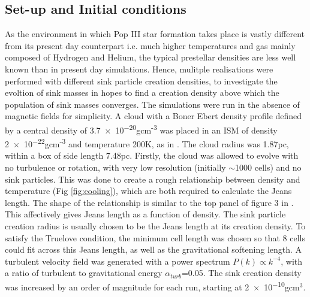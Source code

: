 \documentclass[11pt]{article}
\begin{document}
\subsection{Set-up and Initial conditions}
\label{sub:ics2}
As the environment in which Pop III star formation takes place is vastly different from its present day counterpart i.e. much higher temperatures and gas mainly composed of Hydrogen and Helium, the typical prestellar densities are less well known than in present day simulations. Hence, mulitple realisations were performed with different sink particle creation densities, to investigate the evoltion of sink masses in hopes to find a creation density above which the population of sink masses converges. The simulations were run in the absence of magnetic fields for simplicity. A cloud with a Boner Ebert density profile defined by a central density of \num{3.7e-20}gcm\textsuperscript{-3}  was placed in an ISM of density \num{2e-22}gcm\textsuperscript{-3} and temperature 200K, as in \cite{Wollenberg2019}. The cloud radius was 1.87pc, within a box of side length 7.48pc. Firstly, the cloud was allowed to evolve with no turbulence or rotation, with very low resolution (initially $\sim$1000 cells) and no sink particles. This was done to create a rough relationship between density and temperature (Fig \ref{fig:cooling}), which are both required to calculate the Jeans length. The shape of the relationship is similar to the top panel of figure 3 in \cite{Yoshida2006}. This affectively gives Jeans length as a function of density. The sink particle creation radius is usually chosen to be the Jeans length at its creation density. To satisfy the Truelove condition, the minimum cell length was chosen so that 8 cells could fit across this Jeans length, as well as the gravitational softening length. A turbulent velocity field was generated with a power spectrum $P(k) \propto k^{-4}$, with a ratio of turbulent to gravitational energy $\alpha_{turb}$=0.05. The sink creation density was increased by an order of magnitude for each run, starting at \num{2e-10}gcm$^{3}$.
\end{document}
